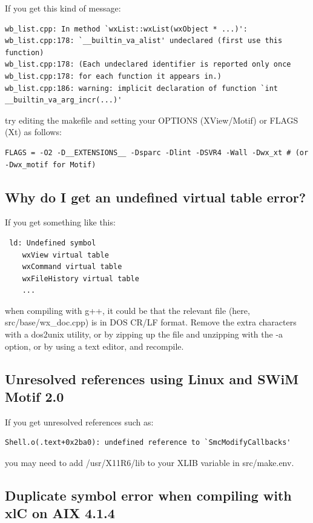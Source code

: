If you get this kind of message:

\begin{verbatim}
wb_list.cpp: In method `wxList::wxList(wxObject * ...)':
wb_list.cpp:178: `__builtin_va_alist' undeclared (first use this function)
wb_list.cpp:178: (Each undeclared identifier is reported only once
wb_list.cpp:178: for each function it appears in.)
wb_list.cpp:186: warning: implicit declaration of function `int __builtin_va_arg_incr(...)'
\end{verbatim}

try editing the makefile and setting your OPTIONS (XView/Motif) or FLAGS (Xt) as follows:

\begin{verbatim}
FLAGS = -O2 -D__EXTENSIONS__ -Dsparc -Dlint -DSVR4 -Wall -Dwx_xt # (or -Dwx_motif for Motif)
\end{verbatim}

\subsection{Why do I get an undefined virtual table error?}

If you get something like this:

\begin{verbatim}
 ld: Undefined symbol 
    wxView virtual table
    wxCommand virtual table
    wxFileHistory virtual table
    ...
\end{verbatim}

when compiling with g++, it could be that the relevant file (here, src/base/wx\_doc.cpp) is in
DOS CR/LF format. Remove the extra characters with a dos2unix utility, or by zipping up the file
and unzipping with the -a option, or by using a text editor, and recompile.

\subsection{Unresolved references using Linux and SWiM Motif 2.0}

If you get unresolved references such as:

\begin{verbatim}
Shell.o(.text+0x2ba0): undefined reference to `SmcModifyCallbacks'
\end{verbatim}

you may need to add /usr/X11R6/lib to your XLIB variable in src/make.env.

\subsection{Duplicate symbol error when compiling with xlC on AIX 4.1.4}

